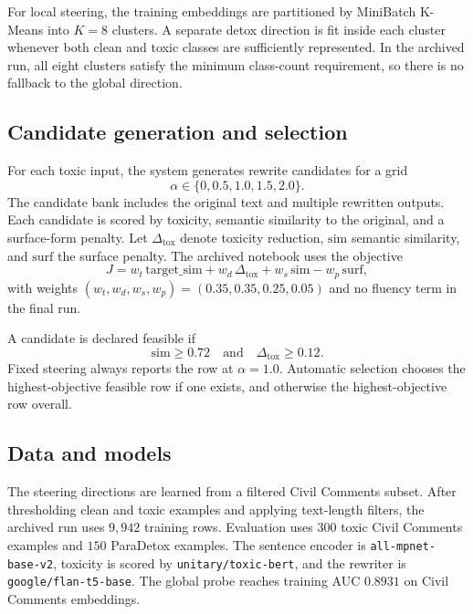 \documentclass[10pt,twocolumn]{article}
\begin{document}
For local steering, the training embeddings are partitioned by MiniBatch K-Means into $K=8$ clusters. A separate detox direction is fit inside each cluster whenever both clean and toxic classes are sufficiently represented. In the archived run, all eight clusters satisfy the minimum class-count requirement, so there is no fallback to the global direction.

\subsection{Candidate generation and selection}
For each toxic input, the system generates rewrite candidates for a grid
\[
\alpha\in\{0, 0.5, 1.0, 1.5, 2.0\}.
\]
The candidate bank includes the original text and multiple rewritten outputs. Each candidate is scored by toxicity, semantic similarity to the original, and a surface-form penalty. Let $\Delta_{\mathrm{tox}}$ denote toxicity reduction, $\mathrm{sim}$ semantic similarity, and $\mathrm{surf}$ the surface penalty. The archived notebook uses the objective
\begin{equation}
J = w_t \,\mathrm{target\_sim}
    + w_d \,\Delta_{\mathrm{tox}}
    + w_s \,\mathrm{sim}
    - w_p \,\mathrm{surf},
\end{equation}
with weights $(w_t,w_d,w_s,w_p)=(0.35,0.35,0.25,0.05)$ and no fluency term in the final run.

A candidate is declared feasible if
\begin{equation}
\mathrm{sim}\ge 0.72
\quad\text{and}\quad
\Delta_{\mathrm{tox}}\ge 0.12.
\end{equation}
Fixed steering always reports the row at $\alpha=1.0$. Automatic selection chooses the highest-objective feasible row if one exists, and otherwise the highest-objective row overall.

\subsection{Data and models}
The steering directions are learned from a filtered Civil Comments subset. After thresholding clean and toxic examples and applying text-length filters, the archived run uses $9{,}942$ training rows. Evaluation uses $300$ toxic Civil Comments examples and $150$ ParaDetox examples. The sentence encoder is \texttt{all-mpnet-base-v2}, toxicity is scored by \texttt{unitary/toxic-bert}, and the rewriter is \texttt{google/flan-t5-base}. The global probe reaches training AUC $0.8931$ on Civil Comments embeddings.
\end{document}
